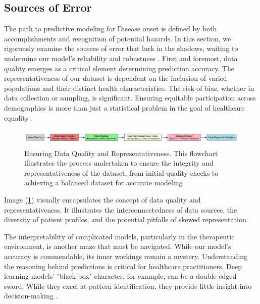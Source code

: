 \documentclass[manuscript,screen,]{acmart}
\begin{document}
\subsection{Sources of Error}

The path to predictive modeling for Disease onset is defined by both accomplishments and recognition of potential hazards. In this section, we rigorously examine the sources of error that lurk in the shadows, waiting to undermine our model's reliability and robustness \cite{Whalen2022}.
First and foremost, data quality emerges as a critical element determining prediction accuracy. The representativeness of our dataset is dependent on the inclusion of varied populations and their distinct health characteristics. The risk of bias, whether in data collection or sampling, is significant. Ensuring equitable participation across demographics is more than just a statistical problem in the goal of healthcare equality \cite{Canali2022Challenges}.

\begin{figure}
    \centering
    \includegraphics[width=1\linewidth]{Images//Sections/Data Quality and Representativeness.png}
    \caption{Ensuring Data Quality and Representativeness. This flowchart illustrates the process undertaken to ensure the integrity and representativeness of the dataset, from initial quality checks to achieving a balanced dataset for accurate modeling}
    \label{fig: Data Quality and Representativeness}
\end{figure}

Image (\ref{fig: Data Quality and Representativeness}) visually encapsulates the concept of data quality and representativeness. It illustrates the interconnectedness of data sources, the diversity of patient profiles, and the potential pitfalls of skewed representation.

The interpretability of complicated models, particularly in the therapeutic environment, is another maze that must be navigated. While our model's accuracy is commendable, its inner workings remain a mystery. Understanding the reasoning behind predictions is critical for healthcare practitioners. Deep learning models' "black box" character, for example, can be a double-edged sword. While they excel at pattern identification, they provide little insight into decision-making \cite{Burns2020InterpretingBB}.
\end{document}
